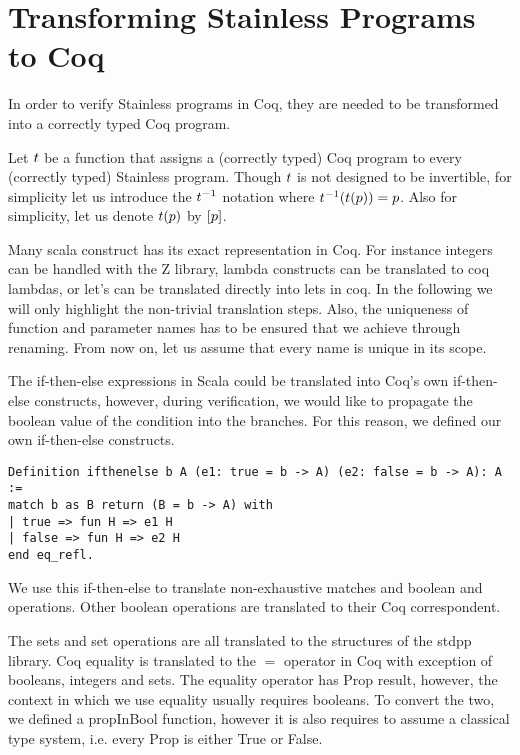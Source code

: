 \section{Transforming Stainless Programs to Coq}
\label{sect:trans}

In order to verify Stainless programs in Coq, they are needed to be transformed into a correctly typed Coq program.

\begin{definition}
	Let $t$ be a function that assigns a (correctly typed) Coq program to every (correctly typed) Stainless program. Though $t$ is not designed to be invertible, for simplicity let us introduce the $t^{-1}$ notation where $t^{-1}(t(p)) = p$. Also for simplicity, let us denote $t(p)$ by $[p]$.
\end{definition}

Many scala construct has its exact representation in Coq. For instance integers can be handled with the Z library, lambda constructs can be translated to coq lambdas, or let's can be translated directly into lets in coq. In the following we will only highlight the non-trivial translation steps. Also, the uniqueness of function and parameter names has to be ensured that we achieve through renaming. From now on, let us assume that every name is unique in its scope.

The if-then-else expressions in Scala could be translated into Coq's own if-then-else constructs, however, during verification, we would like to propagate the boolean value of the condition into the branches. For this reason, we defined our own if-then-else constructs.

\begin{lstlisting}[style=myCoqstyle]
Definition ifthenelse b A (e1: true = b -> A) (e2: false = b -> A): A :=
match b as B return (B = b -> A) with
| true => fun H => e1 H
| false => fun H => e2 H
end eq_refl.
\end{lstlisting}

We use this if-then-else to translate non-exhaustive matches and boolean and operations. Other boolean operations are translated to their Coq correspondent.

The sets and set operations are all translated to the structures of the stdpp library. Coq equality is translated to the $=$ operator in Coq with exception of booleans, integers and sets. The equality operator has Prop result, however, the context in which we use equality usually requires booleans. To convert the two, we defined a propInBool function, however it is also requires to assume a classical type system, i.e. every Prop is either True or False.

